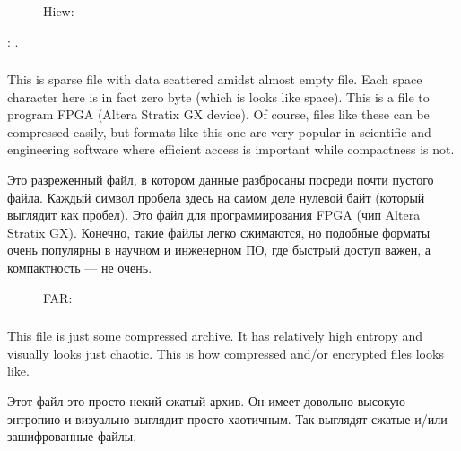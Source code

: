 \begin{figure}[H]
\centering
{}
\caption{Hiew: }
\end{figure}

: 
.

\clearpage
\subsubsection{}

\ifdefined\ENGLISH
This is sparse file with data scattered amidst almost empty file.
Each space character here is in fact zero byte (which is looks like space).
This is a file to program FPGA (Altera Stratix GX device).
Of course, files like these can be compressed easily, but formats like this one are very popular in scientific and engineering software where efficient access is important while compactness is not.
\fi %

\ifdefined\RUSSIAN
Это разреженный файл, в котором данные разбросаны посреди почти пустого файла.
Каждый символ пробела здесь на самом деле нулевой байт (который выглядит как пробел).
Это файл для программирования FPGA (чип Altera Stratix GX).
Конечно, такие файлы легко сжимаются, но подобные форматы очень популярны в научном и инженерном ПО, где быстрый доступ важен, а компактность --- не очень.
\fi %

\begin{figure}[H]
\centering
{}
\caption{FAR: }
\end{figure}

\clearpage
\subsubsection{}

\ifdefined\ENGLISH
This file is just some compressed archive.
It has relatively high entropy and visually looks just chaotic.
This is how compressed and/or encrypted files looks like.
\fi %

\ifdefined\RUSSIAN
Этот файл это просто некий сжатый архив.
Он имеет довольно высокую энтропию и визуально выглядит просто хаотичным.
Так выглядят сжатые и/или зашифрованные файлы.
\fi %

